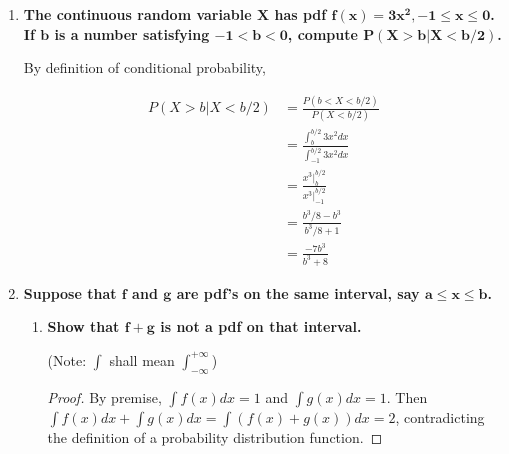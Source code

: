 \documentclass[10pt, oneside]{article}
\begin{document}
\begin{enumerate}[label=4.\arabic*]
Given the probability distribution function, we derive

\begin{align*}
\int^{j+1}_{j} be^{-bx} dx &= -e^{-bx} \Big|^{j+1}_j \\
&= -e^{-(j+1)x} + e^{-jx} \\
&= e^{-jx} (1 - e^{-x} ) \\
\end{align*}

Let $a = e^{-x}$, then the above becomes $(1-a)a^j$.

\item  \begin{tcolorbox}[
  colback=Cerulean!5!white,
  colframe=Cerulean!75!black]
\textbf{The continuous random variable $\bm{X}$ has pdf $\bm{f(x) = 3x^2, -1 \leq x \leq 0}$. If $\bm{b}$ is a number satisfying $\bm{-1 < b < 0}$, compute $\bm{P(X > b | X < b/2)}$.}
\end{tcolorbox}

By definition of conditional probability,

\begin{align*}
P(X > b | X < b/2) &= \frac{P(b < X < b/2)}{P(X < b/2)} \\
&= \frac{\int^{b/2}_b 3x^2 dx}{\int^{b/2}_{-1} 3x^2 dx} \\
&= \frac{x^3 \Big|^{b/2}_b}{x^3 \Big|^{b/2}_{-1}} \\
&= \frac{b^3/8 - b^3}{b^3/8 + 1} \\
&= \boxed{ \frac{-7b^3}{b^3 + 8} }
\end{align*}

\item  \begin{tcolorbox}[
  colback=Cerulean!5!white,
  colframe=Cerulean!75!black]
\textbf{Suppose that $\bm{f}$ and $\bm{g}$ are pdf's on the same interval, say $\bm{a \leq x \leq b}$.}
\end{tcolorbox}

	\begin{enumerate}
	\item  \begin{tcolorbox}[
	  colback=Cerulean!5!white,
	  colframe=Cerulean!75!black]
	\textbf{Show that $\bm{f + g}$ is not a pdf on that interval.}
	\end{tcolorbox}
	
	(Note: $\int$ shall mean $\int^{+\infty}_{-\infty}$)
	
	\begin{proof}
	By premise, $\int f(x) dx = 1$ and $\int g(x) dx = 1$. Then $\int f(x) dx + \int g(x) dx = \int (f(x) + g(x))dx = 2$, contradicting the definition of a probability distribution function. 
	\end{proof}
	

\end{enumerate}
\end{enumerate}
\end{document}
